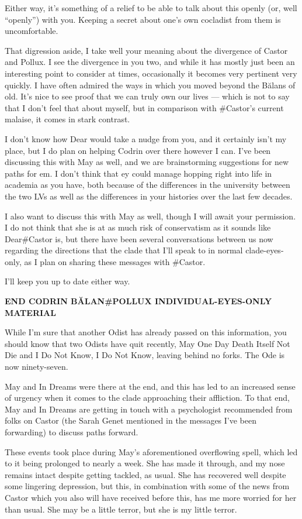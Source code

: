 Either way, it's something of a relief to be able to talk about this openly (or, well ``openly'') with you. Keeping a secret about one's own cocladist from them is uncomfortable.

That digression aside, I take well your meaning about the divergence of Castor and Pollux. I see the divergence in you two, and while it has mostly just been an interesting point to consider at times, occasionally it becomes very pertinent very quickly. I have often admired the ways in which you moved beyond the Bălans of old. It's nice to see proof that we can truly own our lives — which is not to say that I don't feel that about myself, but in comparison with \#Castor's current malaise, it comes in stark contrast.

I don't know how Dear would take a nudge from you, and it certainly isn't my place, but I do plan on helping Codrin over there however I can. I've been discussing this with May as well, and we are brainstorming suggestions for new paths for em. I don't think that ey could manage hopping right into life in academia as you have, both because of the differences in the university between the two LVs as well as the differences in your histories over the last few decades.

I also want to discuss this with May as well, though I will await your permission. I do not think that she is at as much risk of conservatism as it sounds like Dear\#Castor is, but there have been several conversations between us now regarding the directions that the clade that I'll speak to in normal clade-eyes-only, as I plan on sharing these messages with \#Castor.

I'll keep you up to date either way.

\textbf{END CODRIN BĂLAN\#POLLUX INDIVIDUAL-EYES-ONLY MATERIAL}

While I'm sure that another Odist has already passed on this information, you should know that two Odists have quit recently, May One Day Death Itself Not Die and I Do Not Know, I Do Not Know, leaving behind no forks. The Ode is now ninety-seven.

May and In Dreams were there at the end, and this has led to an increased sense of urgency when it comes to the clade approaching their affliction. To that end, May and In Dreams are getting in touch with a psychologist recommended from folks on Castor (the Sarah Genet mentioned in the messages I've been forwarding) to discuss paths forward.

These events took place during May's aforementioned overflowing spell, which led to it being prolonged to nearly a week. She has made it through, and my nose remains intact despite getting tackled, as usual. She has recovered well despite some lingering depression, but this, in combination with some of the news from Castor which you also will have received before this, has me more worried for her than usual. She may be a little terror, but she is my little terror.

